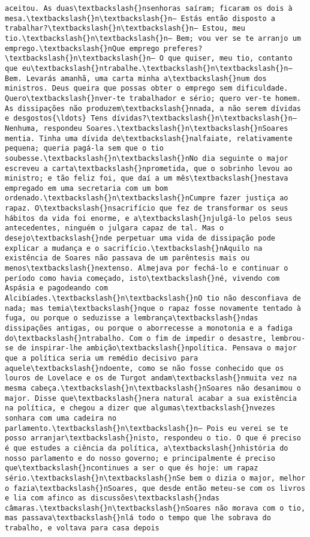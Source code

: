 \begin{Verbatim}[commandchars=\\\{\}]
aceitou. As duas\textbackslash{}nsenhoras saíram; ficaram os dois à mesa.\textbackslash{}n\textbackslash{}n— Estás então disposto a trabalhar?\textbackslash{}n\textbackslash{}n— Estou, meu tio.\textbackslash{}n\textbackslash{}n— Bem; vou ver se te arranjo um emprego.\textbackslash{}nQue emprego preferes?\textbackslash{}n\textbackslash{}n— O que quiser, meu tio, contanto que eu\textbackslash{}ntrabalhe.\textbackslash{}n\textbackslash{}n— Bem. Levarás amanhã, uma carta minha a\textbackslash{}num dos ministros. Deus queira que possas obter o emprego sem dificuldade. Quero\textbackslash{}nver-te trabalhador e sério; quero ver-te homem. As dissipações não produzem\textbackslash{}nnada, a não serem dívidas e desgostos{\ldots} Tens dívidas?\textbackslash{}n\textbackslash{}n— Nenhuma, respondeu Soares.\textbackslash{}n\textbackslash{}nSoares mentia. Tinha uma dívida de\textbackslash{}nalfaiate, relativamente pequena; queria pagá-la sem que o tio soubesse.\textbackslash{}n\textbackslash{}nNo dia seguinte o major escreveu a carta\textbackslash{}nprometida, que o sobrinho levou ao ministro; e tão feliz foi, que daí a um mês\textbackslash{}nestava empregado em uma secretaria com um bom ordenado.\textbackslash{}n\textbackslash{}nCumpre fazer justiça ao rapaz. O\textbackslash{}nsacrifício que fez de transformar os seus hábitos da vida foi enorme, e a\textbackslash{}njulgá-lo pelos seus antecedentes, ninguém o julgara capaz de tal. Mas o desejo\textbackslash{}nde perpetuar uma vida de dissipação pode explicar a mudança e o sacrifício.\textbackslash{}nAquilo na existência de Soares não passava de um parêntesis mais ou menos\textbackslash{}nextenso. Almejava por fechá-lo e continuar o período como havia começado, isto\textbackslash{}né, vivendo com Aspásia e pagodeando com Alcibíades.\textbackslash{}n\textbackslash{}nO tio não desconfiava de nada; mas temia\textbackslash{}nque o rapaz fosse novamente tentado à fuga, ou porque o seduzisse a lembrança\textbackslash{}ndas dissipações antigas, ou porque o aborrecesse a monotonia e a fadiga do\textbackslash{}ntrabalho. Com o fim de impedir o desastre, lembrou-se de inspirar-lhe ambição\textbackslash{}npolítica. Pensava o major que a política seria um remédio decisivo para aquele\textbackslash{}ndoente, como se não fosse conhecido que os louros de Lovelace e os de Turgot andam\textbackslash{}nmuita vez na mesma cabeça.\textbackslash{}n\textbackslash{}nSoares não desanimou o major. Disse que\textbackslash{}nera natural acabar a sua existência na política, e chegou a dizer que algumas\textbackslash{}nvezes sonhara com uma cadeira no parlamento.\textbackslash{}n\textbackslash{}n— Pois eu verei se te posso arranjar\textbackslash{}nisto, respondeu o tio. O que é preciso é que estudes a ciência da política, a\textbackslash{}nhistória do nosso parlamento e do nosso governo; e principalmente é preciso que\textbackslash{}ncontinues a ser o que és hoje: um rapaz sério.\textbackslash{}n\textbackslash{}nSe bem o dizia o major, melhor o fazia\textbackslash{}nSoares, que desde então meteu-se com os livros e lia com afinco as discussões\textbackslash{}ndas câmaras.\textbackslash{}n\textbackslash{}nSoares não morava com o tio, mas passava\textbackslash{}nlá todo o tempo que lhe sobrava do trabalho, e voltava para casa depois 
\end{Verbatim}
